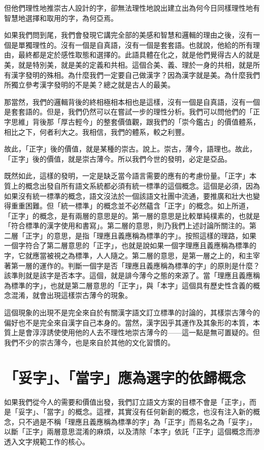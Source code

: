 \documentclass[a5paper, 12pt, openany]{book} %
\begin{document}
但他們理性地推崇古人設計的字，卻無法理性地說出建立出為何今日同樣理性地有智慧地選擇和取用的字，為何亞焉。

如果我們問到尾，我們會發現它講完全部的美感和智慧和邏輯的理由之後，沒有一個是單獨理性的。沒有一個是自真語，沒有一個是套套語。也就說，他給的所有理由，最終都是定於感性取態和選擇的。此語具體在化之，就是他們覺得古人的就是美，就是特別美，就是美的定義和共相。這個合美、義、理於一身的共相，就是所有漢字發明的殊相。為什麼我們一定要自己做漢字？因為漢字就是美。為什麼我們所獨立參考漢字發明的不是美？總之就是古人的最美。 

那當然，我們的邏輯背後的終相極相本相也是這樣，沒有一個是自真語，沒有一個是套套語的。但是，我們仍然可以在嘗試一步的理性分析。我們可以問他們的「正字思維」背後那「厚古輕今」的整套價值觀，跟我們的「崇今鑑古」的價值體系，相比之下，何者利大之。我相信，我們的體系，較之利豐。

故此，「正字」後的價值，就是某種的崇古。說上。崇古，薄今，語理也。故此，「正字」後的價值，就是崇古薄今。所以我們今世的發明，必定是亞品。

既然如此，這樣的發明，一定是缺乏當今語言需要的應有的考慮份量。「正字」本質上的概念出發自所有語文系統都必須有統一標準的這個概念。這個是必須，因為如果沒有統一標準的概念，語文沒法於一個該語文社團中流通，要推廣和壯大也變得重重困難。但「統一標準」的概念並不必然蘊含「正字」的概念。如上所道，「正字」的概念，是有兩層的意思是的。第一層的意思是比較單純樸素的，也就是「符合標準的漢字使用和書寫」。第二層的意思，則乃我們上述討論所關注的。第二層「正字」的意思，是指「理應且義應稱為標準的字」。按照這樣的理路，如果一個字符合了第二層意思的「正字」，也就是說如果一個字理應且義應稱為標準的字，它就應當被視之為標準，人人隨之。第二層的意思，是第一層之上的，和主宰著第一層的運作的。判斷一個字是否「理應且義應稱為標準的字」的原則是什麼？該準則就是該字是否本字。這個，就是誹今薄今之態的來源了。當「理應且義應稱為標準的字」，也就是第二層意思的「正字」，與「本字」這個具有歷史性含義的概念混淆，就會出現這樣崇古薄今的現象。

這個現象的出現不是完全來自於有關漢字語文訂立標準的討論的，其樣崇古薄今的偏好也不是完全來自漢字自己本身的。當然，漢字因乎其運作及其象形的本質，本質上是會淳淳誘使使用他的人去不理性地崇古薄今的——這一點是無可置疑的。但我們不少的崇古薄今，也是來自於其他的文化習慣的。

\section{「妥字」、「當字」應為選字的依歸概念}

如果我們從今人的需要和價值出發，我們訂立語文方案的目標不會是「正字」，而是「妥字」、「當字」的概念。這裡，其實沒有任何新創的概念，也沒有注入新的概念，只不過是不稱「理應且義應稱為標準的字」為「正字」而易名之為「妥字」，以斷「正字」兩層意思混淆的麻煩，以及清除「本字」依託「正字」這個概念而滲透入文字規範工作的核心。
\end{document}
